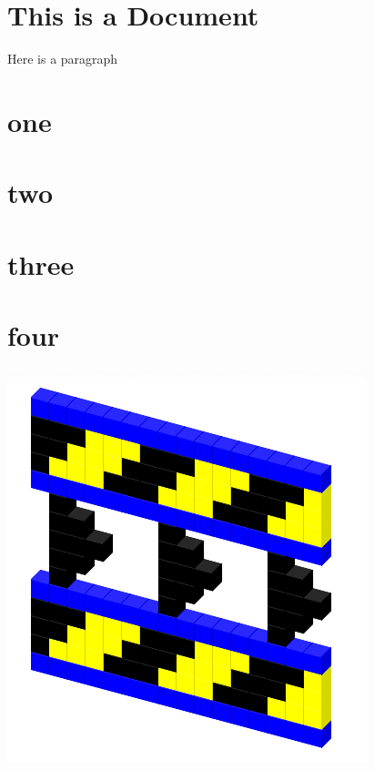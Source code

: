 \documentclass[11pt]{article}
\begin{document}
\section{
This is a Document}


Here is a paragraph


\section{
one}

\section{
two}

\section{
three}

\section{
four}



\includegraphics[width=\linewidth]{../../uploadimages/image1.png}
\end{document}
